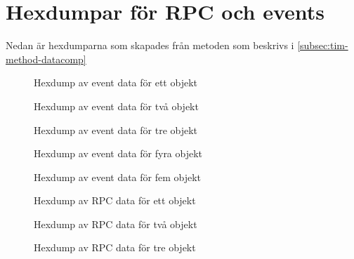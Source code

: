 \chapter{Hexdumpar för RPC och events}
\label{app:hexdumps}

Nedan är hexdumparna som skapades från metoden som beskrivs i \ref{subsec:tim-method-datacomp}

\begin{figure}
    \scriptsize
    \center
    
    \caption{Hexdump av event data för ett objekt}
    \label{fig:tim-eventdata1}
\end{figure}

\begin{figure}
    \scriptsize
    \center
    
    \caption{Hexdump av event data för två objekt}
    \label{fig:tim-eventdata2}
\end{figure}

\begin{figure}
    \scriptsize
    \center
    
    \caption{Hexdump av event data för tre objekt}
    \label{fig:tim-eventdata3}
\end{figure}

\begin{figure}
    \scriptsize
    \center
    
    \caption{Hexdump av event data för fyra objekt}
    \label{fig:tim-eventdata4}
\end{figure}

\begin{figure}
    \scriptsize
    \center
    
    \caption{Hexdump av event data för fem objekt}
    \label{fig:tim-eventdata5}
\end{figure}

\begin{figure}
    \scriptsize
    \center
    
    \caption{Hexdump av RPC data för ett objekt}
    \label{fig:tim-rpcdata1}
\end{figure}

\begin{figure}
    \scriptsize
    \center
    
    \caption{Hexdump av RPC data för två objekt}
    \label{fig:tim-rpcdata2}
\end{figure}

\begin{figure}
    \scriptsize
    \center
    
    \caption{Hexdump av RPC data för tre objekt}
    \label{fig:tim-rpcdata3}
\end{figure}

